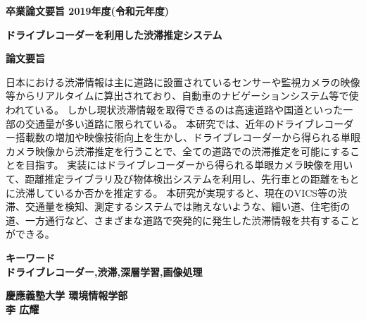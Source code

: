 \begin{center}
\textbf{\Large 卒業論文要旨 2019年度(令和元年度)}

\vspace{6.18mm}

\textbf{\Large ドライブレコーダーを利用した渋滞推定システム}
\end{center}

\vspace{10mm}

\begin{flushleft}
\textbf{論文要旨}\\
\end{flushleft}
日本における渋滞情報は主に道路に設置されているセンサーや監視カメラの映像等からリアルタイムに算出されており、自動車のナビゲーションシステム等で使われている。
しかし現状渋滞情報を取得できるのは高速道路や国道といった一部の交通量が多い道路に限られている。
本研究では、近年のドライブレコーダー搭載数の増加や映像技術向上を生かし、ドライブレコーダーから得られる単眼カメラ映像から渋滞推定を行うことで、全ての道路での渋滞推定を可能にすることを目指す。
実装にはドライブレコーダーから得られる単眼カメラ映像を用いて、距離推定ライブラリ及び物体検出システムを利用し、先行車との距離をもとに渋滞しているか否かを推定する。
本研究が実現すると、現在のVICS等の渋滞、交通量を検知、測定するシステムでは賄えないような、細い道、住宅街の道、一方通行など、さまざまな道路で突発的に発生した渋滞情報を共有することができる。


\begin{flushleft}
\textbf{キーワード}\\
\textbf{ドライブレコーダー,渋滞,深層学習,画像処理}

\end{flushleft}

\begin{flushright}
\textbf{慶應義塾大学 環境情報学部}\\
\textbf{李 広耀}
\end{flushright}
\newpage

